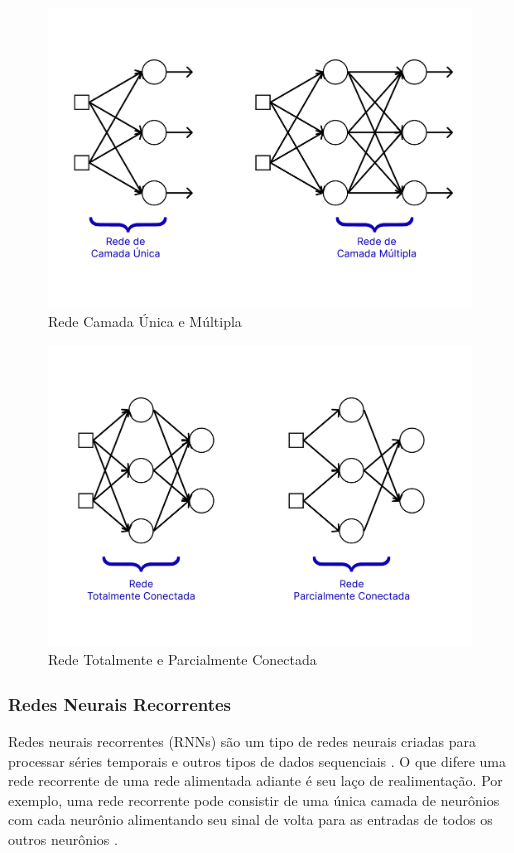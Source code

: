 \documentclass{automatextcc}
\begin{document}
\begin{figure}[ht!]
    \centering
    \includegraphics[width=.7\textwidth]{figuras/network_layers.pdf}
	\caption{Rede Camada Única e Múltipla \citep[adaptado de][]{haykin2009}}
\end{figure}

\begin{figure}[ht!]
    \centering
    \includegraphics[width=.7\textwidth]{figuras/network_connections.pdf}
	\caption{Rede Totalmente e Parcialmente Conectada \citep[adaptado de][]{haykin2009}}
\end{figure}


            
\subsubsection{Redes Neurais Recorrentes}
Redes neurais recorrentes (RNNs) são um tipo de redes neurais criadas para processar séries temporais e outros tipos de dados sequenciais \citep{fan2021}. O que difere uma rede recorrente de uma rede alimentada adiante é seu laço de realimentação. Por exemplo, uma rede recorrente pode consistir de uma única camada de neurônios com cada neurônio alimentando seu sinal de volta para as entradas de todos os outros neurônios \citep{haykin2009}. 
\end{document}
